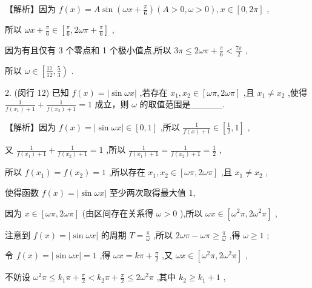 \documentclass[10pt]{article}
\begin{document}
【解析】因为 \(f\left( x\right)  = A\sin \left( {{\omega x} + \frac{\pi }{6}}\right) \left( {A > 0,\omega  > 0}\right) ,x \in  \left\lbrack  {0,{2\pi }}\right\rbrack\) ,

所以 \({\omega x} + \frac{\pi }{6} \in  \left\lbrack  {\frac{\pi }{6},{2\omega \pi } + \frac{\pi }{6}}\right\rbrack\) ,

因为有且仅有 3 个零点和 1 个极小值点,所以 \({3\pi } \leq  {2\omega \pi } + \frac{\pi }{6} < \frac{7\pi }{2}\) ,

所以 \(\omega  \in  \left\lbrack  {\frac{17}{12},\frac{5}{3}}\right)\) .

2. (闵行 12) 已知 \(f\left( x\right)  = \left| {\sin {\omega x}}\right|\) ,若存在 \({x}_{1},{x}_{2} \in  \left\lbrack  {{\omega \pi },{2\omega \pi }}\right\rbrack\) ,且 \({x}_{1} \neq  {x}_{2}\) ,使得 \(\frac{1}{f\left( {x}_{1}\right)  + 1} + \frac{1}{f\left( {x}_{2}\right)  + 1} = 1\) 成立，则 \(\omega\) 的取值范围是\_\_\_\_\_.

【解析】因为 \(f\left( x\right)  = \left| {\sin {\omega x}}\right|  \in  \left\lbrack  {0,1}\right\rbrack\) ,所以 \(\frac{1}{f\left( x\right)  + 1} \in  \left\lbrack  {\frac{1}{2},1}\right\rbrack\) ,

又 \(\frac{1}{f\left( {x}_{1}\right)  + 1} + \frac{1}{f\left( {x}_{2}\right)  + 1} = 1\) ,所以 \(\frac{1}{f\left( {x}_{1}\right)  + 1} = \frac{1}{f\left( {x}_{2}\right)  + 1} = \frac{1}{2}\) ,

所以 \(f\left( {x}_{1}\right)  = f\left( {x}_{2}\right)  = 1\) ,所以存在 \({x}_{1},{x}_{2} \in  \left\lbrack  {{\omega \pi },{2\omega \pi }}\right\rbrack\) ,且 \({x}_{1} \neq  {x}_{2}\) ,

使得函数 \(f\left( x\right)  = \left| {\sin {\omega x}}\right|\) 至少两次取得最大值 1,

因为 \(x \in  \left\lbrack  {{\omega \pi },{2\omega \pi }}\right\rbrack\) (由区间存在关系得 \(\omega  > 0\) ),所以 \({\omega x} \in  \left\lbrack  {{\omega }^{2}\pi ,2{\omega }^{2}\pi }\right\rbrack\) ,

注意到 \(f\left( x\right)  = \left| {\sin {\omega x}}\right|\) 的周期 \(T = \frac{\pi }{\omega }\) ,所以 \({2\omega \pi } - {\omega \pi } \geq  \frac{\pi }{\omega }\) ,得 \(\omega  \geq  1\) ;

令 \(f\left( x\right)  = \left| {\sin {\omega x}}\right|  = 1\) ,得 \({\omega x} = {k\pi } + \frac{\pi }{2}\) ,又 \({\omega x} \in  \left\lbrack  {{\omega }^{2}\pi ,2{\omega }^{2}\pi }\right\rbrack\) ,

不妨设 \({\omega }^{2}\pi  \leq  {k}_{1}\pi  + \frac{\pi }{2} < {k}_{2}\pi  + \frac{\pi }{2} \leq  2{\omega }^{2}\pi\) ,其中 \({k}_{2} \geq  {k}_{1} + 1\) ,
\end{document}
